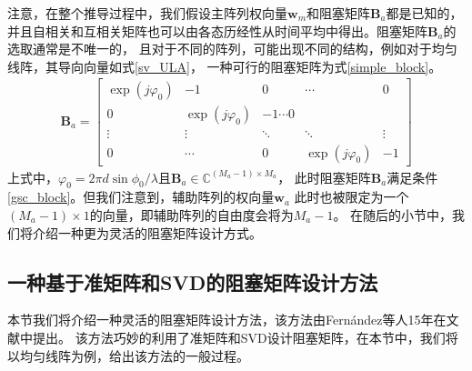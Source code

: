 \documentclass[master]{thesis-uestc}
\begin{document}
注意，在整个推导过程中，我们假设主阵列权向量$\bm{w}_m$和阻塞矩阵$\bm{B}_a$都是已知的，
并且自相关和互相关矩阵也可以由各态历经性从时间平均中得出。阻塞矩阵$\bm{B}_a$的选取通常是不唯一的，
且对于不同的阵列，可能出现不同的结构，例如对于均匀线阵，其导向向量如式\eqref{sv_ULA}，
一种可行的阻塞矩阵为式\eqref{simple_block}。
\begin{equation}\label{simple_block}
    \begin{aligned}
        \bm{B}_a = \begin{bmatrix}
                    \exp(j\varphi_0) & -1 & 0 & \cdots & 0 \\
                    0 & \exp(j\varphi_0) & -1 \cdots 0 \\
                    \vdots & \vdots & \ddots & \ddots & \vdots \\
                    0 & \cdots & 0 & \exp(j\varphi_0) & -1
                   \end{bmatrix}
    \end{aligned}
\end{equation}
上式中，$\varphi_0=2\pi d\sin\phi_0/\lambda$且$\bm{B}_a\in\mathbb{C}^{(M_a-1)\times M_a}$，
此时阻塞矩阵$\bm{B}_a$满足条件\eqref{gsc_block}。但我们注意到，辅助阵列的权向量$\bm{w}_a$
此时也被限定为一个$(M_a-1)\times1$的向量，即辅助阵列的自由度会将为$M_a-1$。
在随后的小节中，我们将介绍一种更为灵活的阻塞矩阵设计方式。

\subsection{一种基于准矩阵和SVD的阻塞矩阵设计方法}
本节我们将介绍一种灵活的阻塞矩阵设计方法，该方法由Fernández等人15年在文献\cite{Fernández}中提出。
该方法巧妙的利用了准矩阵和SVD设计阻塞矩阵，在本节中，我们将以均匀线阵为例，给出该方法的一般过程。
\end{document}
